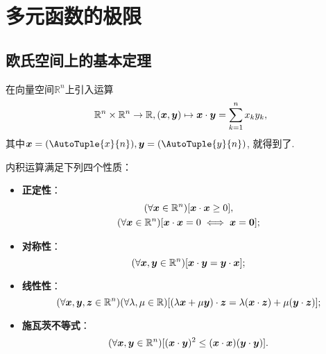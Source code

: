 \section{多元函数的极限}
\subsection{欧氏空间上的基本定理}
在向量空间\(\mathbb{R}^n\)上引入运算\[
	\mathbb{R}^n \times \mathbb{R}^n \to \mathbb{R},
	(\boldsymbol{x},\boldsymbol{y}) \mapsto \boldsymbol{x}\cdot\boldsymbol{y} = \sum_{k=1}^n x_k y_k,
\]
其中\(\vb{x}=(\AutoTuple{x}{n}),
\vb{y}=(\AutoTuple{y}{n})\),
就得到了.

内积运算满足下列四个性质：\begin{itemize}
	\item {\rm\bf 正定性}：\begin{gather*}
		(\forall \boldsymbol{x}\in\mathbb{R}^n)
		[\boldsymbol{x}\cdot\boldsymbol{x}\geq0], \\
		(\forall \boldsymbol{x}\in\mathbb{R}^n)
		[\boldsymbol{x}\cdot\boldsymbol{x}=0 \iff \boldsymbol{x}=\boldsymbol0];
	\end{gather*}
	\item {\rm\bf 对称性}：\begin{equation*}
		(\forall \boldsymbol{x},\boldsymbol{y}\in\mathbb{R}^n)
		[\boldsymbol{x}\cdot\boldsymbol{y} = \boldsymbol{y}\cdot\boldsymbol{x}];
	\end{equation*}
	\item {\rm\bf 线性性}：\begin{equation*}
		(\forall \boldsymbol{x},\boldsymbol{y},\boldsymbol{z}\in\mathbb{R}^n)
		(\forall \lambda,\mu\in\mathbb{R})
		[(\lambda\boldsymbol{x}+\mu\boldsymbol{y})\cdot\boldsymbol{z} = \lambda(\boldsymbol{x}\cdot\boldsymbol{z}) + \mu(\boldsymbol{y}\cdot\boldsymbol{z})];
	\end{equation*}
	\item {\rm\bf 施瓦茨不等式}：\begin{equation*}
		(\forall \boldsymbol{x},\boldsymbol{y}\in\mathbb{R}^n)
		[(\boldsymbol{x}\cdot\boldsymbol{y})^2 \leq (\boldsymbol{x}\cdot\boldsymbol{x})(\boldsymbol{y}\cdot\boldsymbol{y})].
	\end{equation*}
\end{itemize}

